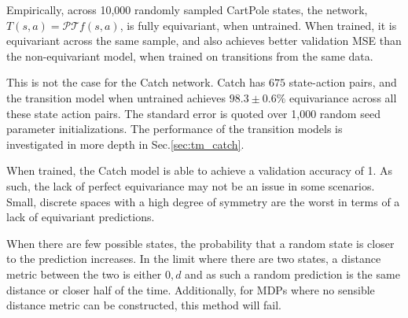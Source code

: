 Empirically, across 10,000 randomly sampled CartPole states, the network, $T(s, a)= \mathcal{P}\mathcal{T}f(s,a)$, is fully equivariant, when untrained. When trained, it is equivariant across the same sample, and also achieves better validation MSE than the non-equivariant model, when trained on transitions from the same data.

This is not the case for the Catch network. Catch has $675$ state-action pairs, and the transition model when untrained achieves $98.3 \pm 0.6\%$ equivariance across all these state action pairs. The standard error is quoted over 1,000 random seed parameter initializations. The performance of the transition models is investigated in more depth in Sec.\ref{sec:tm_catch}.

When trained, the Catch model is able to achieve a validation accuracy of 1. As such, the lack of perfect equivariance may not be an issue in some scenarios. Small, discrete spaces with a high degree of symmetry are the worst in terms of a lack of equivariant predictions.

When there are few possible states, the probability that a random state is closer to the prediction increases. In the limit where there are two states, a distance metric between the two is either $0, d$ and as such a random prediction is the same distance or closer half of the time.  Additionally, for MDPs where no sensible distance metric can be constructed, this method will fail.

